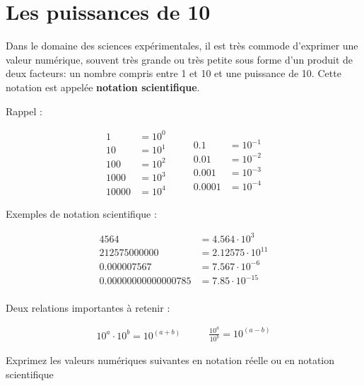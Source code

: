 \documentclass[
  11pt,
  a4paper,
  openany]{book}
\begin{document}
\hypertarget{les-puissances-de-10}{%
\section{Les puissances de 10}\label{les-puissances-de-10}}

Dans le domaine des sciences expérimentales, il est très commode d'exprimer une valeur numérique, souvent très grande ou très petite sous forme d'un produit de deux facteurs: un nombre compris entre 1 et 10 et une puissance de 10. Cette notation est appelée \textbf{notation scientifique}.

Rappel :

\[ \begin{split}
    1 &= 10^0\\
    10 &= 10^1\\
    100 &= 10^2\\
    1000 &= 10^3\\
    10000 &= 10^4
\end{split}
\qquad
\begin{split}
    \\
    0.1 &= 10^{-1}\\
    0.01 &= 10^{-2}\\
    0.001 &= 10^{-3}\\
    0.0001 &= 10^{-4}
\end{split} \]

Exemples de notation scientifique :

\[ \begin{split}
    4564 &= 4.564\cdot10^3\\
    212575000000 &= 2.12575\cdot10^{11}\\
    0.000007567 &= 7.567\cdot10^{-6}\\
    0.00000000000000785 &= 7.85\cdot10^{-15}\\
\end{split} \]

Deux relations importantes à retenir :

\[ \begin{split}
    10^a \cdot 10^b = 10^{(a+b)}
\end{split}
\qquad
\begin{split}
    \frac{10^a}{10^b} = 10^{(a-b)}
\end{split} \]

\begin{Exercise}
Exprimez les valeurs numériques suivantes en notation réelle ou en notation scientifique

\end{Exercise}
\end{document}
